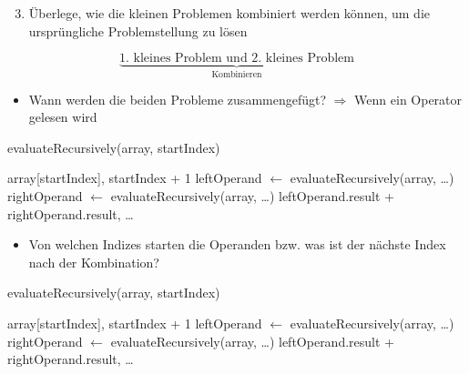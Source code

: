 \documentclass{../tuda-beamer}
\begin{document}
    \begin{frame}[c]
        
    \end{frame}

    \begin{frame}
        \begin{enumerate}
            \setcounter{enumi}{2}
            \item Überlege, wie die kleinen Problemen kombiniert werden können, um die
            ursprüngliche Problemstellung zu lösen
        \end{enumerate}

        \begin{equation*}
            \underbrace{\text{1. kleines Problem und 2. kleines Problem}}_{\text{Kombinieren}}
        \end{equation*}

        \begin{itemize}
            \item Wann werden die beiden Probleme zusammengefügt? \pause \(\Rightarrow\) Wenn ein
            Operator gelesen wird
        \end{itemize}

        \begin{algorithm}[H]
            \caption{evaluateRecursively(array, startIndex)}
            \begin{algorithmic}[1]
                    \State \Return array[startIndex], startIndex + 1
                \Else
                    \State leftOperand \(\leftarrow\) evaluateRecursively(array, \dots)
                    \State rightOperand \(\leftarrow\) evaluateRecursively(array, \dots)
                    \State \Return leftOperand.result + rightOperand.result, \dots
                \EndIf
            \end{algorithmic}
        \end{algorithm}
    \end{frame}

    \begin{frame}
        \begin{itemize}
            \item Von welchen Indizes starten die Operanden bzw. was ist der nächste Index nach
            der Kombination?
        \end{itemize}

        \begin{algorithm}[H]
            \caption{evaluateRecursively(array, startIndex)}
            \begin{algorithmic}[1]
                    \State \Return array[startIndex], startIndex + 1
                \Else
                    \State leftOperand \(\leftarrow\) evaluateRecursively(array, \dots)
                    \State rightOperand \(\leftarrow\) evaluateRecursively(array, \dots)
                    \State \Return leftOperand.result + rightOperand.result, \dots
                \EndIf
            \end{algorithmic}
        \end{algorithm}
    \end{frame}
\end{document}
